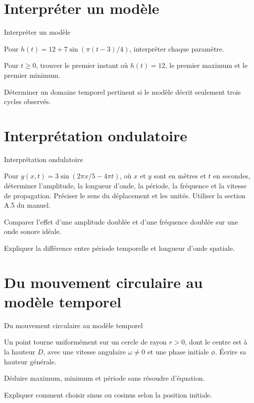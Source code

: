 \section{Interpréter un modèle}
\label{workbook:section:17.04}
\begin{exerciseblock}{Interpréter un modèle}
\item Pour $h(t)=12+7\sin(\pi(t-3)/4)$, interpréter chaque paramètre.
\item Pour $t\ge0$, trouver le premier instant où $h(t)=12$, le premier maximum et le premier minimum.
\item Déterminer un domaine temporel pertinent si le modèle décrit seulement trois cycles observés.
\end{exerciseblock}
\section{Interprétation ondulatoire}
\label{workbook:section:17.05}
\begin{exerciseblock}{Interprétation ondulatoire}
\item Pour $y(x,t)=3\sin(2\pi x/5-4\pi t)$, où $x$ et $y$ sont en mètres et $t$ en secondes, déterminer l'amplitude, la longueur d'onde, la période, la fréquence et la vitesse de propagation. Préciser le sens du déplacement et les unités. Utiliser la section A.5 du manuel.
\item Comparer l'effet d'une amplitude doublée et d'une fréquence doublée sur une onde sonore idéale.
\item Expliquer la différence entre période temporelle et longueur d'onde spatiale.
\end{exerciseblock}
\section{Du mouvement circulaire au modèle temporel}
\label{workbook:section:17.06}
\begin{exerciseblock}{Du mouvement circulaire au modèle temporel}
\item Un point tourne uniformément sur un cercle de rayon $r>0$, dont le centre est à la hauteur $D$, avec une vitesse angulaire $\omega\ne0$ et une phase initiale $\phi$. Écrire sa hauteur générale.
\item Déduire maximum, minimum et période sans résoudre d'équation.
\item Expliquer comment choisir sinus ou cosinus selon la position initiale.
\end{exerciseblock}
